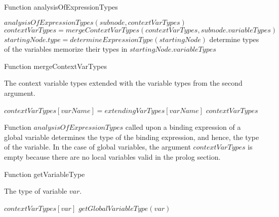 \begin{algorithm}
\caption{Function analysisOfExpressionTypes}
\label{ALG_func_analysisOfExpressionTypes}
\begin{algorithmic}[1]

    \STATE $analysisOfExpressionTypes(subnode, contextVarTypes)$ 
        \STATE $contextVarTypes = mergeContextVarTypes(contextVarTypes, subnode.variableTypes)$
    \ENDIF
\ENDFOR
{}
    \STATE $startingNode.type = determineExpressionType(startingNode)$
\ENDIF
{}
    \STATE determine types of the variables
    \STATE memorize their types in $startingNode.variableTypes$
\ENDIF
\end{algorithmic}
\end{algorithm}

\begin{algorithm}
\caption{Function mergeContextVarTypes}
\label{ALG_function_mergeContextVarTypes}
\begin{algorithmic}[1]
\ENSURE The context variable types extended with the variable types from the second argument.

    \STATE $contextVarTypes[varName] = extendingVarTypes[varName]$
\ENDFOR
\RETURN $contextVarTypes$
\end{algorithmic}
\end{algorithm}

Function $analysisOfExpressionTypes$ called upon a binding expression of a global variable determines the type of the binding expression, and hence, the type of the variable. In the case of global variables, the argument $contextVarTypes$ is empty because there are no local variables valid in the prolog section.

\begin{algorithm}
\caption{Function getVariableType}
\label{ALG_function_get_variable_type}
\begin{algorithmic}[1]
\ENSURE The type of variable $var$.

     \RETURN $contextVarTypes[var]$
\ELSE
     \RETURN $getGlobalVariableType(var)$
\ENDIF
\end{algorithmic}
\end{algorithm}

